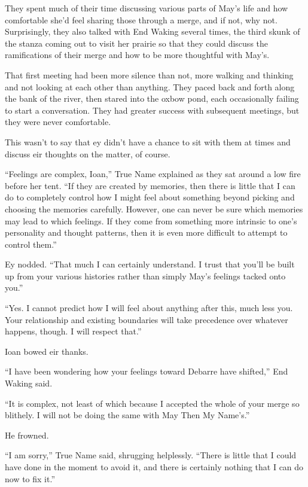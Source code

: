 They spent much of their time discussing various parts of May's life and how comfortable she'd feel sharing those through a merge, and if not, why not. Surprisingly, they also talked with End Waking several times, the third skunk of the stanza coming out to visit her prairie so that they could discuss the ramifications of their merge and how to be more thoughtful with May's.

That first meeting had been more silence than not, more walking and thinking and not looking at each other than anything. They paced back and forth along the bank of the river, then stared into the oxbow pond, each occasionally failing to start a conversation. They had greater success with subsequent meetings, but they were never comfortable.

This wasn't to say that ey didn't have a chance to sit with them at times and discuss eir thoughts on the matter, of course.

``Feelings are complex, Ioan,'' True Name explained as they sat around a low fire before her tent. ``If they are created by memories, then there is little that I can do to completely control how I might feel about something beyond picking and choosing the memories carefully. However, one can never be sure which memories may lead to which feelings. If they come from something more intrinsic to one's personality and thought patterns, then it is even more difficult to attempt to control them.''

Ey nodded. ``That much I can certainly understand. I trust that you'll be built up from your various histories rather than simply May's feelings tacked onto you.''

``Yes. I cannot predict how I will feel about anything after this, much less you. Your relationship and existing boundaries will take precedence over whatever happens, though. I will respect that.''

Ioan bowed eir thanks.

``I have been wondering how your feelings toward Debarre have shifted,'' End Waking said.

``It is complex, not least of which because I accepted the whole of your merge so blithely. I will not be doing the same with May Then My Name's.''

He frowned.

``I am sorry,'' True Name said, shrugging helplessly. ``There is little that I could have done in the moment to avoid it, and there is certainly nothing that I can do now to fix it.''

